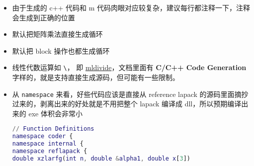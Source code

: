 \begin{itemize}
\begin{lstlisting}[language=matlab]
% 加减乘除、取矩阵元
% a = rand(3, 4);
a = rand(3, 4);
% ret=ret+ sprintf('sum(a) = %0.5e\n', sum(a(:)));
ret=ret+ sprintf('sum(a) = %0.5e\n', sum(a(:)));
% b = rand(3, 4);
b = rand(3, 4);
% ret=ret+ sprintf('sum(b) = %0.5e\n', sum(b(:)));
ret=ret+ sprintf('sum(b) = %0.5e\n', sum(b(:)));
% c = sqrt(a.^2 + b.^2);
c = sqrt(a.^2 + b.^2);
% ret=ret+ sprintf('sum(c) = %0.5e\n', sum(c(:)));
ret=ret+ sprintf('sum(c) = %0.5e\n', sum(c(:)));
% for i = 1:3
for i = 1:3
    % for j = 1:4
    for j = 1:4
        % if c(i, j) ~= sqrt(a(i,j)^2 + b(i, j)^2)
        if c(i, j) ~= sqrt(a(i,j)^2 + b(i, j)^2)
            ret=ret+ sprintf('error: c(i, j) = %0.5e\n', c(i, j));
        end
    end
end

% 解线性方程组
% A = rand(30,30);
A = rand(30,30);
% ret=ret+ sprintf('sum(A) = %0.5e\n', sum(A(:)));
ret=ret+ sprintf('sum(A) = %0.5e\n', sum(A(:)));
% X = rand(30,100);
X = rand(30,100);
% ret=ret+ sprintf('sum(X) = %0.5e\n', sum(X(:)));
ret=ret+ sprintf('sum(X) = %0.5e\n', sum(X(:)));
% B = A * X;
B = A * X;
% ret=ret+ sprintf('sum(B) = %0.5e\n', sum(B(:)));
ret=ret+ sprintf('sum(B) = %0.5e\n', sum(B(:)));
% X1 = A \ B;
X1 = A \ B;
% ret=ret+ sprintf('sum(X1) = %0.5e\n', sum(X1(:)));
ret=ret+ sprintf('sum(X1) = %0.5e\n', sum(X1(:)));
% if norm(X-X1) > 1e-10
if norm(X-X1) > 1e-10
    % ret=ret+ sprintf('error: norm(X-X1) = %0.5e\n', norm(X-X1));
    ret=ret+ sprintf('error: norm(X-X1) = %0.5e\n', norm(X-X1));
end

% 本征问题
% A = A + A.';
A = A + A.';
% ret=ret+ sprintf('sum(A) = %0.5e\n', sum(A(:)));
ret=ret+ sprintf('sum(A) = %0.5e\n', sum(A(:)));
% [V, D] = eig(A);
[V, D] = eig(A);
% err = max(max(abs(A*V - V*D)));
err = max(max(abs(A*V - V*D)));
% if err > 1e-10
if err > 1e-10
    % ret=ret+ sprintf('error: err = %0.5e\n', err);
    ret=ret+ sprintf('error: err = %0.5e\n', err);
end
end
\end{lstlisting}
\item 由于生成的 c++ 代码和 m 代码肉眼对应较复杂，建议每行都注释一下，注释会生成到正确的位置
\item 默认把矩阵乘法直接生成循环
\item 默认把 block 操作也都生成循环
\item 线性代数运算如 \verb`\`， 即 \href{https://www.mathworks.com/help/releases/R2024b/matlab/ref/double.mldivide.html}{mldivide}，文档里面有 \textbf{C/C++ Code Generation} 字样的，就是支持直接生成源码，但可能有一些限制。
\item 从 \verb`namespace` 来看，好些代码应该是直接从 reference lapack 的源码里面摘抄过来的，剥离出来的好处就是不用把整个 lapack 编译成 dll，所以预期编译出来的 exe 体积会非常小
\begin{lstlisting}[language=matlab]
// Function Definitions
namespace coder {
namespace internal {
namespace reflapack {
double xzlarfg(int n, double &alpha1, double x[3])
\end{lstlisting}
\end{itemize}
